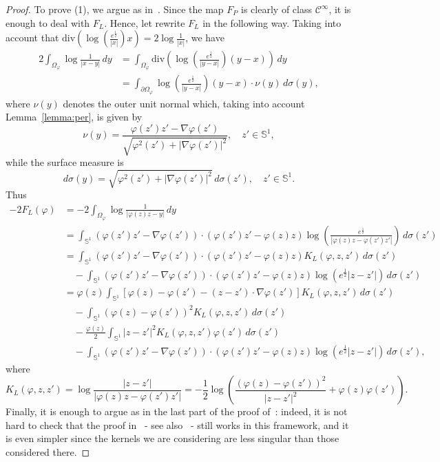 \documentclass[10pt,reqno,english]{amsart}
\newcommand{\Su}{\mathbb{S}^1}
\theoremstyle{definition}
\numberwithin{equation}{section}
\begin{document}
\begin{proof}
To prove (1), we argue as in~\cite[Proposition 7]{Fr19}. Since the map $F_P$ is clearly of class $\mathcal C^\infty$, it is enough to deal with $F_L $. Hence, let rewrite $F_L $ in the following way. Taking into account that $\mathrm{div}\left(\log\left(\frac{e^{\frac12}}{|x|}\right)x\right)=2\log\frac{1}{|x|}$, we have
\begin{align*}
2\int_{\Omega_\varphi}\log\frac{1}{|x-y|}\,dy&=\int_{\Omega_\varphi}\mathrm{div}\left(\log\left(\frac{e^{\frac12}}{|y-x|}\right)(y-x)\right)\,dy\\
&=\int_{\partial\Omega_\varphi}\log\left(\frac{e^{\frac12}}{|y-x|}\right)(y-x)\cdot\nu(y)\,d\sigma(y),
\end{align*}
where $\nu(y)$ denotes the outer unit normal which, taking into account Lemma~\ref{lemma:per}, is given by
\[
\nu(y)=\frac{\varphi(z')z'-\nabla\varphi(z')}{ \sqrt{\varphi^2(z') + |\nabla \varphi(z') |^2} },\quad z'\in\Su,
\]
while the surface measure is
\[
d\sigma(y)=\sqrt{\varphi^2(z') + |\nabla \varphi(z') |^2} \, d\sigma(z'),\quad z'\in\Su.
\]
Thus
\begin{align*}
-2F_L (\varphi)&=-2\int_{\Omega_\varphi}\log\frac{1}{|\varphi(z)z-y|}\,dy\\
&=\int_{\Su}\!(\varphi(z')z'-\nabla \varphi(z'))\cdot(\varphi(z')z'-\varphi(z)z)\log\!\left(\!\frac{e^{\frac12}}{|\varphi(z)z-\varphi(z')z'|}\!\right)\,d\sigma(z')\\
&=\int_{\Su}(\varphi(z')z'-\nabla \varphi(z'))\cdot(\varphi(z')z'-\varphi(z)z)K_L(\varphi,z,z')\,d\sigma(z')\\
&\quad-\int_{\Su}(\varphi(z')z'-\nabla \varphi(z'))\cdot(\varphi(z')z'-\varphi(z)z)\log\left(e^{\frac12}|z-z'|\right)\,d\sigma(z')\\
&=\varphi(z)\int_{\Su}[\varphi(z)-\varphi(z')-(z-z')\cdot\nabla \varphi(z')]K_L(\varphi,z,z')\,d\sigma(z')\\
&\quad-\int_{\Su}(\varphi(z)-\varphi(z'))^2K_L(\varphi,z,z')\,d\sigma(z')\\
&\quad-\frac{\varphi(z)}{2}\int_{\Su}|z-z'|^2K_L(\varphi,z,z')\varphi(z')\,d\sigma(z')\\
&\quad-\int_{\Su}(\varphi(z')z'-\nabla \varphi(z'))\cdot(\varphi(z')z'-\varphi(z)z)\log\left(e^{\frac12}|z-z'|\right)\,d\sigma(z'),
\end{align*}
where
\[
K_L(\varphi,z,z')=\log\frac{|z-z'|}{|\varphi(z)z-\varphi(z')z'|}=-\frac12\log\left(\frac{(\varphi(z)-\varphi(z'))^2}{|z-z'|^2}+\varphi(z)\varphi(z')\right).
\]
 Finally, it is enough to argue as in the last part of the proof of~\cite[Proposition 7]{Fr19}: indeed, it is not hard to check that the proof in~\cite[Section 4]{CFW} - see also~\cite{Fa18} - still works in this framework, and it is even simpler since the kernels we are considering are less singular than those considered there.



\end{proof}
\end{document}
